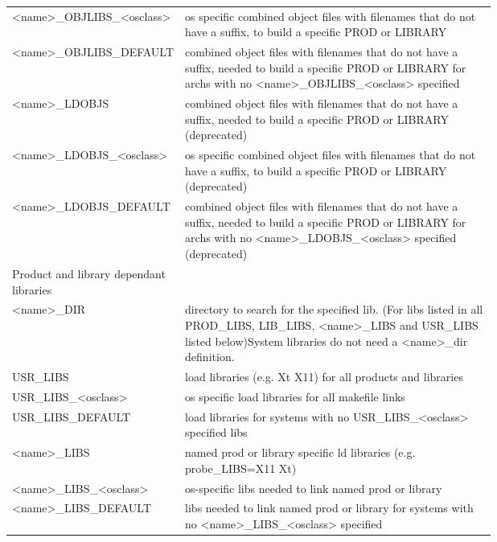 \begin{center}
\begin{longtable}{lp{0.7\linewidth}}
\textless{}name\textgreater{}\_OBJLIBS\_\textless{}osclass\textgreater{} & os specific combined object files with filenames that do not have a suffix, to build a specific PROD or LI\textbar{}BRARY\\
\textless{}name\textgreater{}\_OBJLIBS\_DEFAULT & combined object files with filenames that do not have a suffix, needed to build a specific PROD or LIBRARY for archs with no \textless{}name\textgreater{}\_OBJLIBS\_\textless{}osclass\textgreater{} specified\\
\textless{}name\textgreater{}\_LDOBJS & combined object files with filenames that do not have a suffix, needed to build a specific PROD or LIBRARY (deprecated)\\
\textless{}name\textgreater{}\_LDOBJS\_\textless{}osclass\textgreater{} & os specific combined object files with filenames that do not have a suffix, to build a specific PROD or LI\textbar{}BRARY (deprecated)\\
\textless{}name\textgreater{}\_LDOBJS\_DEFAULT & combined object files with filenames that do not have a suffix, needed to build a specific PROD or LIBRARY for archs with no \textless{}name\textgreater{}\_LDOBJS\_\textless{}osclass\textgreater{} specified (deprecated)\\
Product and library dependant libraries & \\
\textless{}name\textgreater{}\_DIR & directory to search for the specified lib. (For libs listed in all PROD\_LIBS, LIB\_LIBS, \textless{}name\textgreater{}\_LIBS and USR\_LIBS listed below)System libraries do not need a \textless{}name\textgreater{}\_dir definition.\\
USR\_LIBS & load libraries (e.g. Xt X11) for all products and libraries\\
USR\_LIBS\_\textless{}osclass\textgreater{} & os specific load libraries for all makefile links\\
USR\_LIBS\_DEFAULT & load libraries for systems with no USR\_LIBS\_\textless{}osclass\textgreater{} specified libs\\
\textless{}name\textgreater{}\_LIBS & named prod or library specific ld libraries (e.g. probe\_LIBS=X11 Xt)\\
\textless{}name\textgreater{}\_LIBS\_\textless{}osclass\textgreater{} & os-specific libs needed to link named prod or library\\
\textless{}name\textgreater{}\_LIBS\_DEFAULT & libs needed to link named prod or library for systems with no \textless{}name\textgreater{}\_LIBS\_\textless{}osclass\textgreater{} specified\\

\end{longtable}
\end{center}
